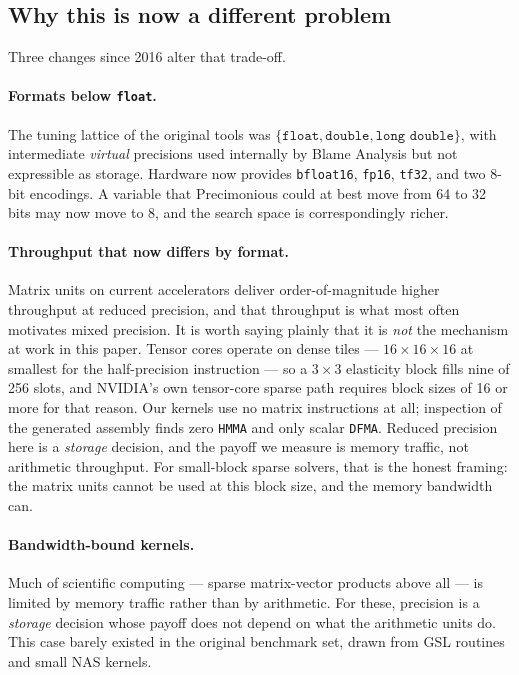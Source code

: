 \documentclass[11pt]{article}
\begin{document}
\subsection{Why this is now a different problem}

Three changes since 2016 alter that trade-off.

\paragraph{Formats below \texttt{float}.} The tuning lattice of the original
tools was $\{\texttt{float}, \texttt{double}, \texttt{long double}\}$, with
intermediate \emph{virtual} precisions used internally by Blame Analysis but not
expressible as storage. Hardware now provides \texttt{bfloat16}, \texttt{fp16},
\texttt{tf32}, and two 8-bit encodings. A variable that Precimonious could at
best move from 64 to 32 bits may now move to 8, and the search space is
correspondingly richer.

\paragraph{Throughput that now differs by format.} Matrix units on current
accelerators deliver order-of-magnitude higher throughput at reduced precision,
and that throughput is what most often motivates mixed precision. It is worth
saying plainly
that it is \emph{not} the mechanism at work in this paper. Tensor cores operate on
dense tiles --- $16\times16\times16$ at smallest for the half-precision
instruction --- so a $3\times3$ elasticity block fills nine of 256 slots, and
NVIDIA's own tensor-core sparse path requires block sizes of
16 or more for that reason. Our kernels use no matrix instructions at all;
inspection of the generated assembly finds zero \texttt{HMMA} and only scalar
\texttt{DFMA}. Reduced precision here is a \emph{storage} decision, and the
payoff we measure is memory traffic, not arithmetic throughput. For small-block
sparse solvers, that is the honest framing: the matrix units cannot be used at this
block size, and the memory bandwidth can.

\paragraph{Bandwidth-bound kernels.} Much of scientific computing --- sparse
matrix-vector products above all --- is limited by memory traffic rather than by
arithmetic. For these, precision is a \emph{storage} decision whose payoff does
not depend on what the arithmetic units do. This case barely existed in the
original benchmark set, drawn from GSL routines and small NAS kernels.
\end{document}
